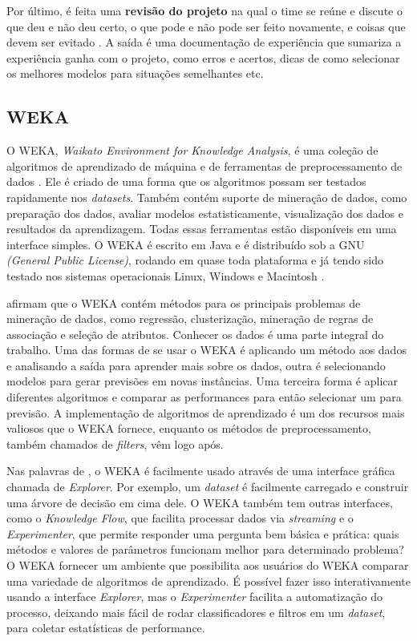 Por último, é feita uma \textbf{revisão do projeto} na qual o time se reúne e discute o que deu e não deu certo, o que pode e não pode ser feito novamente, e coisas que devem ser evitado \citep{dmfd}.
A saída é uma documentação de experiência que sumariza a experiência ganha com o projeto, como erros e acertos, dicas de como selecionar os melhores modelos para situações semelhantes etc.

\subsection{WEKA}

O WEKA, \textit{Waikato Environment for Knowledge Analysis}, é uma coleção de algoritmos de aprendizado de máquina e de ferramentas de preprocessamento de dados \citep{weka}. Ele é criado de uma forma que os algoritmos possam ser testados rapidamente nos \textit{datasets}. Também contém suporte de mineração de dados, como preparação dos dados, avaliar modelos estatisticamente, visualização dos dados e resultados da aprendizagem. Todas essas ferramentas estão disponíveis em uma interface simples. O WEKA é escrito em Java e é distribuído sob a GNU \textit{(General Public License)}, rodando em quase toda plataforma e já tendo sido testado nos sistemas operacionais Linux, Windows e Macintosh \citep{weka}.

 afirmam que o WEKA contém métodos para os principais problemas de mineração de dados, como regressão, clusterização, mineração de regras de associação e seleção de atributos. Conhecer os dados é uma parte integral do trabalho. Uma das formas de se usar o WEKA é aplicando um método aos dados e analisando a saída para aprender mais sobre os dados, outra é selecionando modelos para gerar previsões em novas instâncias. Uma terceira forma é aplicar diferentes algoritmos e comparar as performances para então selecionar um para previsão. A implementação de algoritmos de aprendizado é um dos recursos mais valiosos que o WEKA fornece, enquanto os métodos de preprocessamento, também chamados de \textit{filters}, vêm logo após. 

Nas palavras de , o WEKA é facilmente usado através de uma interface gráfica chamada de \textit{Explorer}. Por exemplo, um \textit{dataset} é facilmente carregado e construir uma árvore de decisão em cima dele. O WEKA também tem outras interfaces, como o \textit{Knowledge Flow}, que facilita processar dados via \textit{streaming} e o \textit{Experimenter}, que permite responder uma pergunta bem básica e prática: quais métodos e valores de parâmetros funcionam melhor para determinado problema? O WEKA fornecer um ambiente que possibilita aos usuários do WEKA comparar uma variedade de algoritmos de aprendizado. É possível fazer isso interativamente usando a  interface \textit{Explorer}, mas o \textit{Experimenter} facilita a automatização do processo, deixando mais fácil de rodar classificadores e filtros em um \textit{dataset}, para coletar estatísticas de performance.

